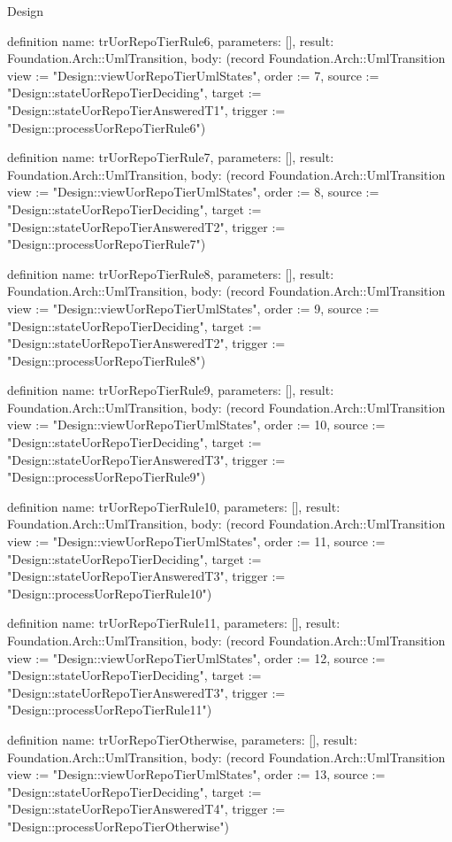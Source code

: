 \begin{lexlean}{Design}
\begin{semanticmodule}
definition{
  name: trUorRepoTierRule6,
  parameters: [],
  result: Foundation.Arch::UmlTransition,
  body: (record Foundation.Arch::UmlTransition {view := "Design::viewUorRepoTierUmlStates", order := 7, source := "Design::stateUorRepoTierDeciding", target := "Design::stateUorRepoTierAnsweredT1", trigger := "Design::processUorRepoTierRule6"})
}

definition{
  name: trUorRepoTierRule7,
  parameters: [],
  result: Foundation.Arch::UmlTransition,
  body: (record Foundation.Arch::UmlTransition {view := "Design::viewUorRepoTierUmlStates", order := 8, source := "Design::stateUorRepoTierDeciding", target := "Design::stateUorRepoTierAnsweredT2", trigger := "Design::processUorRepoTierRule7"})
}

definition{
  name: trUorRepoTierRule8,
  parameters: [],
  result: Foundation.Arch::UmlTransition,
  body: (record Foundation.Arch::UmlTransition {view := "Design::viewUorRepoTierUmlStates", order := 9, source := "Design::stateUorRepoTierDeciding", target := "Design::stateUorRepoTierAnsweredT2", trigger := "Design::processUorRepoTierRule8"})
}

definition{
  name: trUorRepoTierRule9,
  parameters: [],
  result: Foundation.Arch::UmlTransition,
  body: (record Foundation.Arch::UmlTransition {view := "Design::viewUorRepoTierUmlStates", order := 10, source := "Design::stateUorRepoTierDeciding", target := "Design::stateUorRepoTierAnsweredT3", trigger := "Design::processUorRepoTierRule9"})
}

definition{
  name: trUorRepoTierRule10,
  parameters: [],
  result: Foundation.Arch::UmlTransition,
  body: (record Foundation.Arch::UmlTransition {view := "Design::viewUorRepoTierUmlStates", order := 11, source := "Design::stateUorRepoTierDeciding", target := "Design::stateUorRepoTierAnsweredT3", trigger := "Design::processUorRepoTierRule10"})
}

definition{
  name: trUorRepoTierRule11,
  parameters: [],
  result: Foundation.Arch::UmlTransition,
  body: (record Foundation.Arch::UmlTransition {view := "Design::viewUorRepoTierUmlStates", order := 12, source := "Design::stateUorRepoTierDeciding", target := "Design::stateUorRepoTierAnsweredT3", trigger := "Design::processUorRepoTierRule11"})
}

definition{
  name: trUorRepoTierOtherwise,
  parameters: [],
  result: Foundation.Arch::UmlTransition,
  body: (record Foundation.Arch::UmlTransition {view := "Design::viewUorRepoTierUmlStates", order := 13, source := "Design::stateUorRepoTierDeciding", target := "Design::stateUorRepoTierAnsweredT4", trigger := "Design::processUorRepoTierOtherwise"})
}


\end{semanticmodule}
\end{lexlean}
